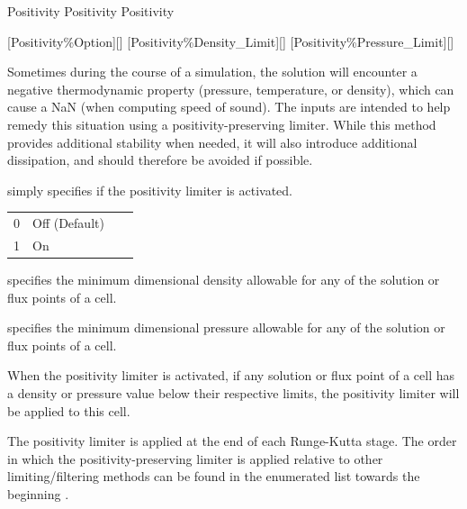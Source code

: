 
\FINALFIX{\newpage}
\begin{nmldescitem}
Positivity%
Positivity%
Positivity%
\end{nmldescitem}
[Positivity\%Option][]
[Positivity\%Density\_Limit][]
[Positivity\%Pressure\_Limit][]

\begin{nmldescbody}
 

Sometimes during the course of a simulation, the solution will encounter a
negative thermodynamic property (pressure, temperature, or density), which can
cause a NaN (\forexample when computing speed of sound).
%
The  inputs are intended to help remedy this situation using
a positivity-preserving limiter.
%
While this method provides additional stability when needed, it will also
introduce additional dissipation, and should therefore be avoided if possible.

 simply specifies if the positivity limiter is activated.
\\
\begin{tabular}{ @{\qquad} r @{ = } p{0.85\linewidth} @{} }
  0 & Off (Default) \\
  1 & On
\end{tabular}

 specifies the minimum dimensional density allowable for
any of the solution or flux points of a cell.
 
 specifies the minimum dimensional pressure allowable
for any of the solution or flux points of a cell.

When the positivity limiter is activated, if any solution or flux point of a
cell has a density or pressure value below their respective limits, the
positivity limiter will be applied to this cell.

The positivity limiter is applied at the end of each Runge-Kutta stage.
%
The order in which the positivity-preserving limiter is applied relative to
other limiting\slash filtering methods can be found in the enumerated list
towards the beginning .
%


\end{nmldescbody}
